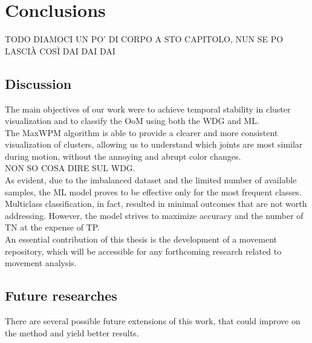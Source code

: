\chapter{Conclusions}
TODO DIAMOCI UN PO' DI CORPO A STO CAPITOLO, NUN SE PO LASCIÀ COSÌ DAI DAI DAI

\section{Discussion}
The main objectives of our work were to achieve temporal stability in cluster visualization and to classify the OoM using both the WDG and ML. \\

The MaxWPM algorithm is able to provide a clearer and more consistent visualization of clusters, allowing us to understand which joints are most similar during motion, without the annoying and abrupt color changes. \\

NON SO COSA DIRE SUL WDG. \\

As evident, due to the imbalanced dataset and the limited number of available samples, the ML model proves to be effective only for the most frequent classes.
Multiclass classification, in fact, resulted in minimal outcomes that are not worth addressing.
However, the model strives to maximize accuracy and the number of TN at the expense of TP. \\

An essential contribution of this thesis is the development of a movement repository, which will be accessible for any forthcoming research related to movement analysis.



\section{Future researches}
There are several possible future extensions of this work, that could improve on the method
and yield better results. \\

